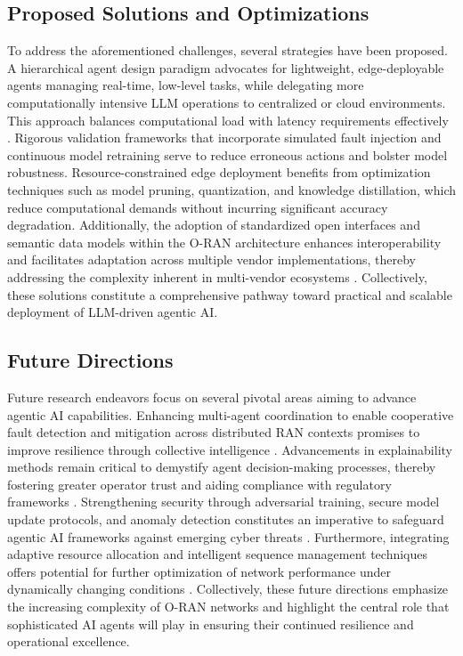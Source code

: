 \subsection{Proposed Solutions and Optimizations}

To address the aforementioned challenges, several strategies have been proposed. A hierarchical agent design paradigm advocates for lightweight, edge-deployable agents managing real-time, low-level tasks, while delegating more computationally intensive LLM operations to centralized or cloud environments. This approach balances computational load with latency requirements effectively \cite{ref55}. Rigorous validation frameworks that incorporate simulated fault injection and continuous model retraining serve to reduce erroneous actions and bolster model robustness. Resource-constrained edge deployment benefits from optimization techniques such as model pruning, quantization, and knowledge distillation, which reduce computational demands without incurring significant accuracy degradation. Additionally, the adoption of standardized open interfaces and semantic data models within the O-RAN architecture enhances interoperability and facilitates adaptation across multiple vendor implementations, thereby addressing the complexity inherent in multi-vendor ecosystems \cite{ref55}. Collectively, these solutions constitute a comprehensive pathway toward practical and scalable deployment of LLM-driven agentic AI.

\subsection{Future Directions}

Future research endeavors focus on several pivotal areas aiming to advance agentic AI capabilities. Enhancing multi-agent coordination to enable cooperative fault detection and mitigation across distributed RAN contexts promises to improve resilience through collective intelligence \cite{ref21}. Advancements in explainability methods remain critical to demystify agent decision-making processes, thereby fostering greater operator trust and aiding compliance with regulatory frameworks \cite{ref48}. Strengthening security through adversarial training, secure model update protocols, and anomaly detection constitutes an imperative to safeguard agentic AI frameworks against emerging cyber threats \cite{ref50}. Furthermore, integrating adaptive resource allocation and intelligent sequence management techniques offers potential for further optimization of network performance under dynamically changing conditions \cite{ref21}. Collectively, these future directions emphasize the increasing complexity of O-RAN networks and highlight the central role that sophisticated AI agents will play in ensuring their continued resilience and operational excellence.

